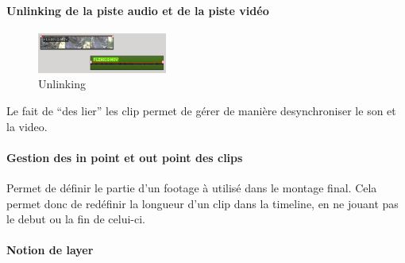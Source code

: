 \paragraph{}

\paragraph{Unlinking de la piste audio et de la piste vidéo}

\begin{figure}

  \vspace{-20pt} \begin{center}

  \includegraphics[width=0.38\textwidth]{images/unlinked}

  \end{center} \vspace{-30pt} \caption{Unlinking} \label{Yes}

  \vspace{-10pt}

\end{figure}

Le fait de ``des lier'' les clip permet de gérer de manière
desynchroniser le son et la video.

\paragraph{Gestion des in point et  out point des clips} %

  Permet de définir le partie d'un footage à utilisé dans le montage
  final. Cela permet donc de redéfinir la longueur d'un clip dans la
  timeline, en ne jouant pas le debut ou la fin de celui-ci.

\paragraph{}

\paragraph{Notion de layer}

